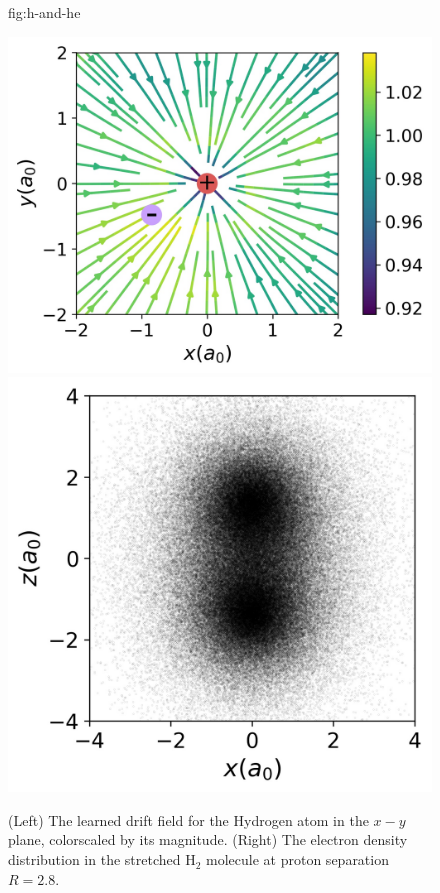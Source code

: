 \documentclass[12pt]{msml2020} %
\begin{document}
\begin{figure}[htbp]
\floatconts
  {fig:h-and-he}%
  {\caption{(Left) The learned drift field for the Hydrogen atom in the $x-y$ plane, colorscaled by its magnitude. (Right) The electron density distribution in the stretched $\text{H}_2$ molecule at proton separation $R=2.8$.}}%
  {\includegraphics[height=0.43\textwidth]{hydrogen_vector_field.jpg}\hfill\includegraphics[height=0.43\textwidth]{H2_density.jpg}}
\end{figure}
\end{document}
